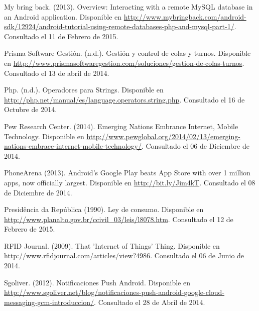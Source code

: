 \begin{spacing}{1.0}
\begin{thebibliography}{99}


\newblock My bring back. (2013).
\newblock Overview: Interacting with a remote MySQL database in an Android application.
\newblock Disponible en \url{http://www.mybringback.com/android-sdk/12924/android-tutorial-using-remote-databases-php-and-mysql-part-1/}.
\newblock Consultado el 11 de Febrero de 2015.




\newblock Prisma Software Gestión. (n.d.).
\newblock Gestión y control de colas y turnos.
\newblock Disponible en \url{http://www.prismasoftwaregestion.com/soluciones/gestion-de-colas-turnos}.
\newblock Consultado el 13 de abril de 2014.

\newblock Php. (n.d.).
\newblock Operadores para Strings.
\newblock Disponible en \url{http://php.net/manual/es/language.operators.string.php}.
\newblock Consultado el 16 de Octubre de 2014.


\newblock Pew Research Center. (2014).
\newblock Emerging Nations Embrance Internet, Mobile Technology.
\newblock Disponible en \url{http://www.pewglobal.org/2014/02/13/emerging-nations-embrace-internet-mobile-technology/}.
\newblock Consultado el 06 de Diciembre de 2014.

\newblock PhoneArena (2013).
\newblock Android's Google Play beats App Store with over 1 million apps, now officially largest.
\newblock Disponible en \url{http://bit.ly/Jim4kT}.
\newblock Consultado el 08 de Diciembre de 2014.

\newblock Presidência da República (1990).
\newblock Ley de consumo.
\newblock Disponible en \url{http://www.planalto.gov.br/ccivil_03/leis/l8078.htm}.
\newblock Consultado el 12 de Febrero de 2015.




\newblock RFID Journal. (2009).
\newblock That 'Internet of Things' Thing. 
\newblock Disponible en \url{http://www.rfidjournal.com/articles/view?4986}.
\newblock Consultado el 06 de Junio de 2014.





\newblock Sgoliver. (2012).
\newblock Notificaciones Push Android.
\newblock Disponible en \url{http://www.sgoliver.net/blog/notificaciones-push-android-google-cloud-messaging-gcm-introduccion/}.
\newblock Consultado el 28 de Abril de 2014.


\end{thebibliography}
\end{spacing}

